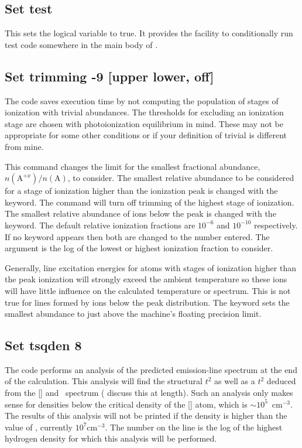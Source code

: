 \subsection{Set test}

This sets the logical variable  to true.
It provides
the facility to conditionally run test code somewhere
in the main body of \Cloudy.

\subsection{Set trimming -9  [upper lower, off]}

The code saves execution time by not computing the population of stages
of ionization with trivial abundances.
The thresholds for excluding an
ionization stage are chosen with photoionization equilibrium in mind.  These
may not be appropriate for some other conditions or if your definition of
trivial is different from mine.

This command changes the limit for the smallest fractional abundance,
$n(\mathrm{A}^{+x})/n(\mathrm{A})$, to consider.
The smallest relative abundance to be considered
for a stage of ionization higher than the ionization peak is changed with
the  keyword.
The command  will turn off trimming
of the highest stage of ionization.
The smallest relative abundance of
ions below the peak is changed with the  keyword.
The default relative
ionization fractions are $10^{-6}$ and $10^{-10}$ respectively.
If no keyword appears
then both are changed to the number entered.
The argument is the log of
the lowest or highest ionization fraction to consider.

Generally, line excitation energies for atoms with
stages of ionization higher than the peak ionization will
strongly exceed the ambient temperature
so these ions will have little influence on the calculated
temperature or spectrum.
This is not true for lines formed by ions below the peak
distribution.
The keyword  sets the smallest abundance to just above
the machine's floating precision limit.

\subsection{Set tsqden 8}

The code performs an analysis of the predicted emission-line spectrum
at the end of the calculation.
This analysis will find the structural $t^2$
as well as a $t^2$ deduced from the [\oiii] and \hi\ spectrum
(\citealp{KingdonFerland1995} discuss this at length).
Such an analysis only makes sense for
densities below the critical density of the [\oiii] atom,
which is $\sim 10^5$~cm$^{-3}$.
The results of this analysis will not be printed if the density is
higher than the value of , currently $10^7 \mathrm{cm}^{-3}$.
The number on the
line is the log of the highest hydrogen density for which this analysis
will be performed.

